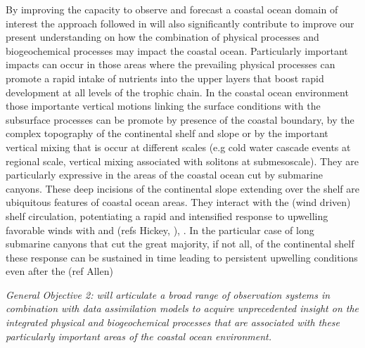 By improving the capacity to observe and forecast a coastal ocean domain
of interest the approach followed in \proj will also significantly
contribute to improve our present understanding on how the combination
of physical processes and biogeochemical processes may impact the
coastal ocean. Particularly important impacts can occur in those areas
where the prevailing physical processes can promote a rapid intake of
nutrients into the upper layers that boost rapid development at all
levels of the trophic chain. In the coastal ocean environment those
importante vertical motions linking the surface conditions with the
subsurface processes can be promote by presence of the coastal boundary,
by the complex topography of the continental shelf and slope or by the
important vertical mixing that is occur at different scales (e.g cold
water cascade events at regional scale, vertical mixing associated with
solitons at submesoscale). They are particularly expressive in the areas
of the coastal ocean cut by submarine canyons. These deep incisions of
the continental slope extending over the shelf are ubiquitous features
of coastal ocean areas. They interact with the (wind driven) shelf
circulation, potentiating a rapid and intensified response to upwelling
favorable winds with and (refs Hickey, ), . In the particular case of
long submarine canyons that cut the great majority, if not all, of the
continental shelf these response can be sustained in time leading to
persistent upwelling conditions even after the (ref Allen)
 
\emph{General Objective 2: \proj will articulate a broad range of
  observation systems in combination with data assimilation models to
  acquire unprecedented insight on the integrated physical and
  biogeochemical processes that are associated with these particularly
  important areas of the coastal ocean environment.}

